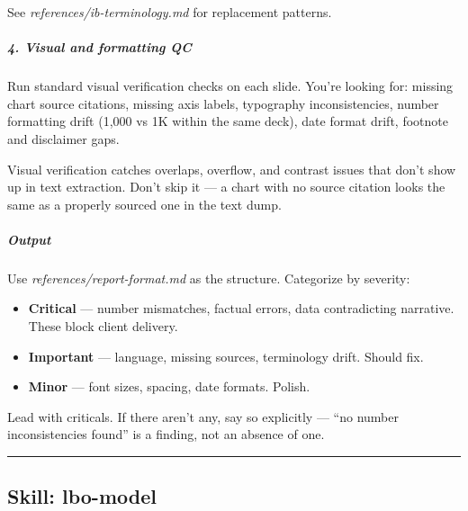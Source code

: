 \documentclass[11pt]{article}
\begin{document}
See \emph{references/ib-terminology.md} for replacement patterns.


\subparagraph{4. Visual and formatting QC}\mbox{}\par

Run standard visual verification checks on each slide. You're looking for: missing chart source citations, missing axis labels, typography inconsistencies, number formatting drift (1,000 vs 1K within the same deck), date format drift, footnote and disclaimer gaps.


Visual verification catches overlaps, overflow, and contrast issues that don't show up in text extraction. Don't skip it — a chart with no source citation looks the same as a properly sourced one in the text dump.


\subparagraph{Output}\mbox{}\par

Use \emph{references/report-format.md} as the structure. Categorize by severity:


\begin{itemize}[leftmargin=*,itemsep=2pt,topsep=2pt]
\item {} \textbf{Critical} — number mismatches, factual errors, data contradicting narrative. These block client delivery.
\item {} \textbf{Important} — language, missing sources, terminology drift. Should fix.
\item {} \textbf{Minor} — font sizes, spacing, date formats. Polish.
\end{itemize}

Lead with criticals. If there aren't any, say so explicitly — ``no number inconsistencies found'' is a finding, not an absence of one.


\vspace{0.8em}\hrule\vspace{0.8em}

\subsection{Skill: lbo-model}\label{file:pitch-agent-skills-lbo-model-SKILL-md}
\end{document}

